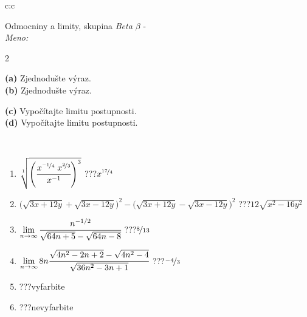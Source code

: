 \documentclass[10pt]{report}
\begin{document}
\begin{tabular}{c:c}
\begin{minipage}[c][104.5mm][t]{0.5\linewidth}
\begin{center}
\vspace{7mm}
{\huge Odmocniny a limity, skupina \textit{Beta $\beta$} -}\\[5mm]
\textit{Meno:}\phantom{xxxxxxxxxxxxxxxxxxxxxxxxxxxxxxxxxxxxxxxxxxxxxxxxxxxxxxxxxxxxxxxxx}\\[5mm]
\begin{minipage}{0.95\linewidth}
\begin{center}
{\small \begin{multicols}{2} \raggedright
\textbf{(a)} Zjednodušte výraz. \\[1mm]
\textbf{(b)} Zjednodušte výraz. \par \columnbreak
\textbf{(c)} Vypočítajte limitu postupnosti. \\[1mm]
\textbf{(d)} Vypočítajte limitu postupnosti.
\end{multicols}
}
\end{center}
\end{minipage}
\\[4mm]
\begin{minipage}{0.79\linewidth}
\begin{center}
\begin{varwidth}{\linewidth}
\begin{enumerate}
\small
\item $\sqrt[1]{\left(\cfrac{x^{\nicefrac{-1}{4}}\;x^{\nicefrac{2}{3}}}{x^{-1}}\right)^{3}}$\quad \dotfill\; ???\;\dotfill \quad $x^{\nicefrac{17}{4}}$
\item {\footnotesize{\scriptsize$\big(\sqrt{3x+12y}+\sqrt{3x-12y}\big)^2-\big(\sqrt{3x+12y}-\sqrt{3x-12y}\big)^2$}\quad \dotfill\; ???\;\dotfill \quad $12\sqrt{x^2-16y^2}$}
\item $\lim\limits_{n\to\infty}\cfrac{n^{-1/2}}{\sqrt{64n+5}-\sqrt{64n-8}}$\quad \dotfill\; ???\;\dotfill \quad $\nicefrac{8}{13}$
\item $\lim\limits_{n\to\infty}8n\cfrac{\sqrt{4n^2-2n+2}-\sqrt{4n^2-4}}{\sqrt{36n^2-3n+1}}$\quad \dotfill\; ???\;\dotfill \quad $\nicefrac{-4}{3}$
\item \quad \dotfill\; ???\;\dotfill \quad vyfarbite
\item \quad \dotfill\; ???\;\dotfill \quad nevyfarbite
\end{enumerate}
\end{varwidth}
\end{center}

\end{minipage}
\end{center}
\end{minipage}
\end{tabular}
\end{document}
